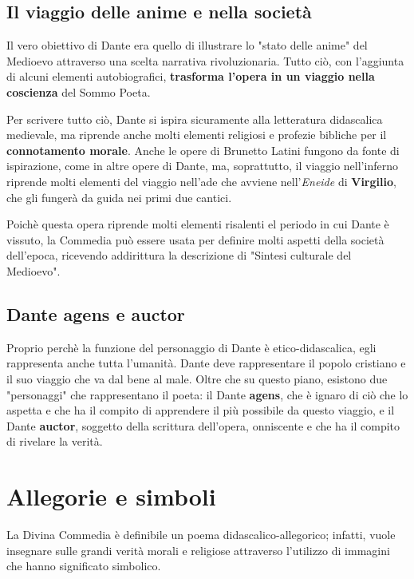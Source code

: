 \documentclass[10pt,a4paper]{article}
\begin{document}
	\subsection{Il viaggio delle anime e nella società}
	
	Il vero obiettivo di Dante era quello di illustrare lo "stato delle anime" del Medioevo attraverso una scelta narrativa rivoluzionaria. Tutto ciò, con l'aggiunta di alcuni elementi autobiografici, \textbf{trasforma l'opera in un viaggio nella coscienza} del Sommo Poeta.
	
	Per scrivere tutto ciò, Dante si ispira sicuramente alla letteratura didascalica medievale, ma riprende anche molti elementi religiosi e profezie bibliche per il \textbf{connotamento morale}. Anche le opere di Brunetto Latini fungono da fonte di ispirazione, come in altre opere di Dante, ma, soprattutto, il viaggio nell'inferno riprende molti elementi del viaggio nell'ade che avviene nell'\textit{Eneide} di \textbf{Virgilio}, che gli fungerà da guida nei primi due cantici. 
	
	Poichè questa opera riprende molti elementi risalenti el periodo in cui Dante è vissuto, la Commedia può essere usata per definire molti aspetti della società dell'epoca, ricevendo addirittura la descrizione di "Sintesi culturale del Medioevo".
	
	\subsection{Dante agens e auctor}
	
	 Proprio perchè la funzione del personaggio di Dante è etico-didascalica, egli rappresenta anche tutta l'umanità. Dante deve rappresentare il popolo cristiano e il suo viaggio che va dal bene al male. Oltre che su questo piano, esistono due "personaggi" che rappresentano il poeta: il Dante \textbf{agens}, che è ignaro di ciò che lo aspetta e che ha il compito di apprendere il più possibile da questo viaggio, e il Dante \textbf{auctor}, soggetto della scrittura dell'opera, onniscente e che ha il compito di rivelare la verità.
	 
	 \section{Allegorie e simboli}
	 
	 La Divina Commedia è definibile un poema didascalico-allegorico; infatti, vuole insegnare sulle grandi verità morali e religiose attraverso l'utilizzo di immagini che hanno significato simbolico.
	 
\end{document}
